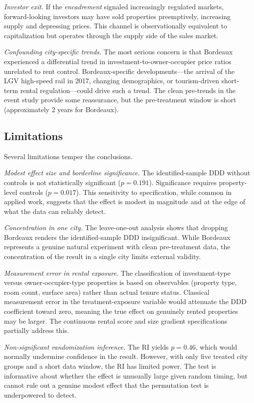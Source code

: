 \documentclass[12pt]{article}
\begin{document}
\emph{Investor exit.} If the \emph{encadrement} signaled increasingly regulated markets, forward-looking investors may have sold properties preemptively, increasing supply and depressing prices. This channel is observationally equivalent to capitalization but operates through the supply side of the sales market.

\emph{Confounding city-specific trends.} The most serious concern is that Bordeaux experienced a differential trend in investment-to-owner-occupier price ratios unrelated to rent control. Bordeaux-specific developments---the arrival of the LGV high-speed rail in 2017, changing demographics, or tourism-driven short-term rental regulation---could drive such a trend. The clean pre-trends in the event study provide some reassurance, but the pre-treatment window is short (approximately 2 years for Bordeaux).

\subsection{Limitations}

Several limitations temper the conclusions.

\emph{Modest effect size and borderline significance.} The identified-sample DDD without controls is not statistically significant ($p = 0.191$). Significance requires property-level controls ($p = 0.017$). This sensitivity to specification, while common in applied work, suggests that the effect is modest in magnitude and at the edge of what the data can reliably detect.

\emph{Concentration in one city.} The leave-one-out analysis shows that dropping Bordeaux renders the identified-sample DDD insignificant. While Bordeaux represents a genuine natural experiment with clean pre-treatment data, the concentration of the result in a single city limits external validity.

\emph{Measurement error in rental exposure.} The classification of investment-type versus owner-occupier-type properties is based on observables (property type, room count, surface area) rather than actual tenure status. Classical measurement error in the treatment-exposure variable would attenuate the DDD coefficient toward zero, meaning the true effect on genuinely rented properties may be larger. The continuous rental score and size gradient specifications partially address this.

\emph{Non-significant randomization inference.} The RI yields $p = 0.46$, which would normally undermine confidence in the result. However, with only five treated city groups and a short data window, the RI has limited power. The test is informative about whether the effect is unusually large given random timing, but cannot rule out a genuine modest effect that the permutation test is underpowered to detect.
\end{document}
